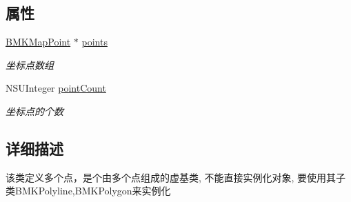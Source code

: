 \subsection*{属性}
\begin{DoxyCompactItemize}
\item 
\hypertarget{interface_b_m_k_multi_point_aa810056a59644284eb13fca968124e0c}{\hyperlink{struct_b_m_k_map_point}{B\+M\+K\+Map\+Point} $\ast$ \hyperlink{interface_b_m_k_multi_point_aa810056a59644284eb13fca968124e0c}{points}}\label{interface_b_m_k_multi_point_aa810056a59644284eb13fca968124e0c}

\begin{DoxyCompactList}\small\item\em 坐标点数组 \end{DoxyCompactList}\item 
\hypertarget{interface_b_m_k_multi_point_a717b76bf8c1c25ce7ae11c959fb4af9f}{N\+S\+U\+Integer \hyperlink{interface_b_m_k_multi_point_a717b76bf8c1c25ce7ae11c959fb4af9f}{point\+Count}}\label{interface_b_m_k_multi_point_a717b76bf8c1c25ce7ae11c959fb4af9f}

\begin{DoxyCompactList}\small\item\em 坐标点的个数 \end{DoxyCompactList}\end{DoxyCompactItemize}


\subsection{详细描述}
该类定义多个点，是个由多个点组成的虚基类, 不能直接实例化对象, 要使用其子类\+B\+M\+K\+Polyline,B\+M\+K\+Polygon来实例化 

